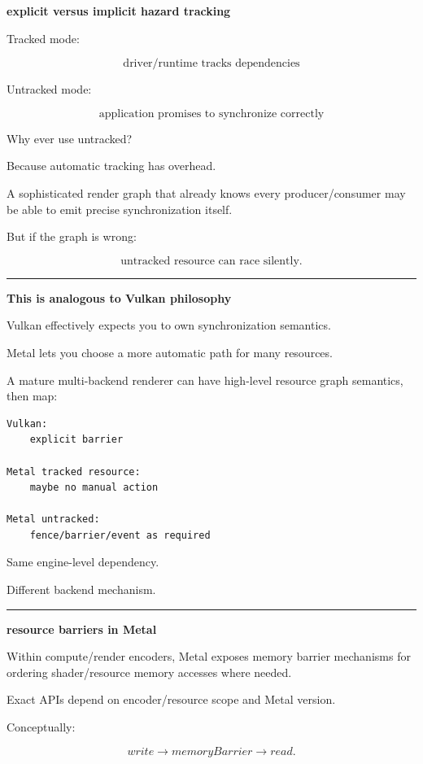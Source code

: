 \textbf{explicit versus implicit hazard tracking}

Tracked mode:

\[
\boxed{
\text{driver/runtime tracks dependencies}
}
\]

Untracked mode:

\[
\boxed{
\text{application promises to synchronize correctly}
}
\]

Why ever use untracked?

Because automatic tracking has overhead.

A sophisticated render graph that already knows every producer/consumer may be able to emit precise synchronization itself.

But if the graph is wrong:

\[
\boxed{
\text{untracked resource can race silently}.
}
\]

\begin{center}\rule{0.5\linewidth}{0.5pt}\end{center}

\textbf{This is analogous to Vulkan philosophy}

Vulkan effectively expects you to own synchronization semantics.

Metal lets you choose a more automatic path for many resources.

A mature multi-backend renderer can have high-level resource graph semantics, then map:

\begin{verbatim}
Vulkan:
    explicit barrier

Metal tracked resource:
    maybe no manual action

Metal untracked:
    fence/barrier/event as required
\end{verbatim}

Same engine-level dependency.

Different backend mechanism.

\begin{center}\rule{0.5\linewidth}{0.5pt}\end{center}

\textbf{resource barriers in Metal}

Within compute/render encoders, Metal exposes memory barrier mechanisms for ordering shader/resource memory accesses where needed.

Exact APIs depend on encoder/resource scope and Metal version.

Conceptually:

\[
write
\rightarrow
memoryBarrier
\rightarrow
read.
\]

